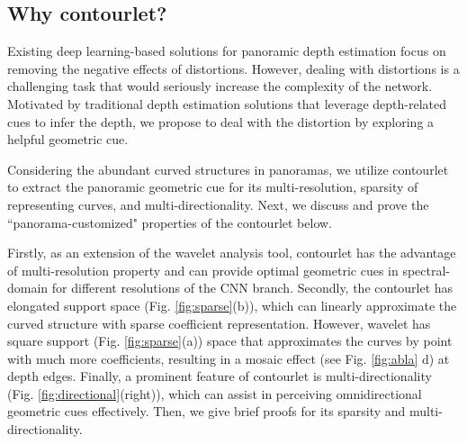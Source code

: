 \documentclass[10pt,times,mathptm,psfig,twocolumn,journals]{IEEEtran}
\begin{document}
\subsection{Why contourlet?}
\label{motivation}
Existing deep learning-based solutions for panoramic depth estimation focus on removing the negative effects of distortions. However, dealing with distortions is a challenging task that would seriously increase the complexity of the network. Motivated by traditional depth estimation solutions that leverage depth-related cues to infer the depth, we propose to deal with the distortion by exploring a helpful geometric cue.

Considering the abundant curved structures in panoramas, we utilize contourlet to extract the panoramic geometric cue for its multi-resolution, sparsity of representing curves, and multi-directionality. Next, we discuss and prove the ``panorama-customized" properties of the contourlet below.


Firstly, as an extension of the wavelet analysis tool, contourlet has the advantage of multi-resolution property and can provide optimal geometric cues in spectral-domain for different resolutions of the CNN branch. Secondly, the contourlet has elongated support space (Fig. \ref{fig:sparse}(b)), which can linearly approximate the curved structure with sparse coefficient representation. However, wavelet has square support (Fig. \ref{fig:sparse}(a)) space that approximates the curves by point with much more coefficients, resulting in a mosaic effect (see Fig. \ref{fig:abla} d) at depth edges. 
Finally, a prominent feature of contourlet is multi-directionality (Fig. \ref{fig:directional}(right)), which can assist in perceiving omnidirectional geometric cues effectively. 
Then, we give brief proofs for its sparsity and multi-directionality.
\end{document}

